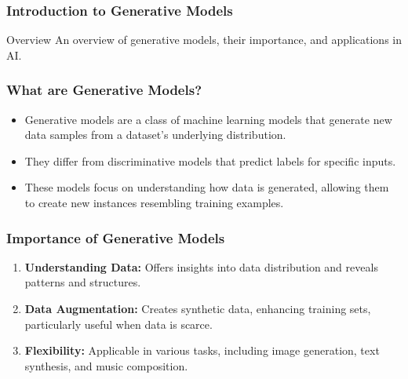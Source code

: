 \documentclass[aspectratio=169]{beamer}
\begin{document}
\frame{\titlepage}

\begin{frame}[fragile]
    \frametitle{Introduction to Generative Models}
    \begin{block}{Overview}
        An overview of generative models, their importance, and applications in AI.
    \end{block}
\end{frame}

\begin{frame}[fragile]
    \frametitle{What are Generative Models?}
    \begin{itemize}
        \item Generative models are a class of machine learning models that generate new data samples from a dataset's underlying distribution.
        \item They differ from discriminative models that predict labels for specific inputs.
        \item These models focus on understanding how data is generated, allowing them to create new instances resembling training examples.
    \end{itemize}
\end{frame}

\begin{frame}[fragile]
    \frametitle{Importance of Generative Models}
    \begin{enumerate}
        \item \textbf{Understanding Data:} Offers insights into data distribution and reveals patterns and structures.
        \item \textbf{Data Augmentation:} Creates synthetic data, enhancing training sets, particularly useful when data is scarce.
        \item \textbf{Flexibility:} Applicable in various tasks, including image generation, text synthesis, and music composition.
    \end{enumerate}
\end{frame}
\end{document}

